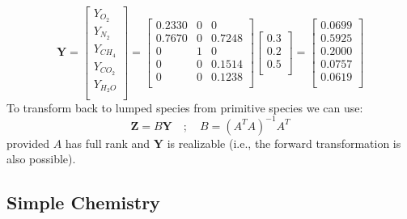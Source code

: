 \begin{equation}\label{eq:transform_to_primitive}
\mathbf{Y}=\left[\begin{array}{c}
       Y_{O_2} \\
       Y_{N_2} \\
       Y_{CH_4} \\
       Y_{CO_2} \\
       Y_{H_2O} \\
     \end{array}\right]
     =\left[\begin{array}{ccc}
     0.2330 & 0 & 0 \\
     0.7670 & 0 & 0.7248 \\
     0 & 1 & 0 \\
     0 & 0 & 0.1514 \\
     0 & 0 & 0.1238 \\
     \end{array}\right]
     \left[\begin{array}{c}
     0.3 \\
     0.2 \\
     0.5 \\
     \end{array}\right]
     =\left[\begin{array}{c}
     0.0699\\
     0.5925\\
     0.2000\\
     0.0757\\
     0.0619\\
     \end{array}\right]
\end{equation}
To transform back to lumped species from primitive species we can use:
\begin{equation}\label{eq:transform_back}
\textbf{Z}=B\textbf{Y} \quad ; \quad B=(A^TA)^{-1}A^T
\end{equation}
provided $A$ has full rank and $\mathbf{Y}$ is realizable (i.e., the forward transformation is also possible).

\subsection{Simple Chemistry}

